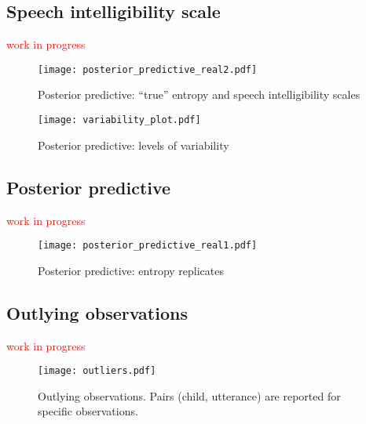 \subsection{Speech intelligibility scale} \label{sS:results_scales}
%
\textcolor{red}{work in progress}
%
\begin{figure}[!h]
	\centering
	\texttt{[image: posterior\_predictive\_real2.pdf]}
	\caption[Posterior predictive: ``true'' entropy and intelligibility scales]{Posterior predictive: ``true'' entropy and speech intelligibility scales}
	\label{fig:predictive2}
\end{figure}
%
\begin{figure}[!h]
	\centering
	\texttt{[image: variability\_plot.pdf]}
	\caption[Posterior predictive: levels of variability]{Posterior predictive: levels of variability}
	\label{fig:variability}
\end{figure}
%
%
\subsection{Posterior predictive} \label{sS:results_posterior}
%
\textcolor{red}{work in progress}
%
\begin{figure}[!h]
	\centering
	\texttt{[image: posterior\_predictive\_real1.pdf]}
	\caption[Posterior predictive: entropy replicates]{Posterior predictive: entropy replicates}
	\label{fig:predictive1}
\end{figure}
%
%
\subsection{Outlying observations} \label{sS:results_outliers}
%
\textcolor{red}{work in progress}
%
\begin{figure}[!h]
	\centering
	\texttt{[image: outliers.pdf]}
	\caption[Outlying observations]{Outlying observations. Pairs (child, utterance) are reported for specific observations.}
	\label{fig:outliers}
\end{figure}
%
%